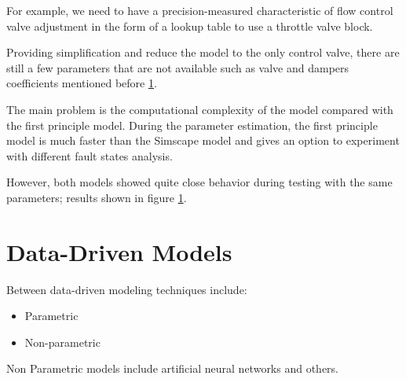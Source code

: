 For example, we need to have a precision-measured characteristic of flow
control valve adjustment in the form of a lookup table to use a throttle
valve block.

Providing simplification and reduce the model to the only control valve,
there are still a few parameters that are not available such as valve and
dampers coefficients mentioned before \ref{}.

The main problem is the computational complexity of the model compared with
the first principle model. During the parameter estimation, the first
principle model is much faster than the Simscape model and gives an option
to experiment with different fault states analysis. 

However, both models showed quite close behavior during testing with the
same parameters; results shown in figure \ref{}.


\section{Data-Driven Models}

Between data-driven modeling techniques include:
\begin{itemize}
    \item Parametric
    \item Non-parametric
\end{itemize}

Non Parametric models include artificial neural networks and others.
